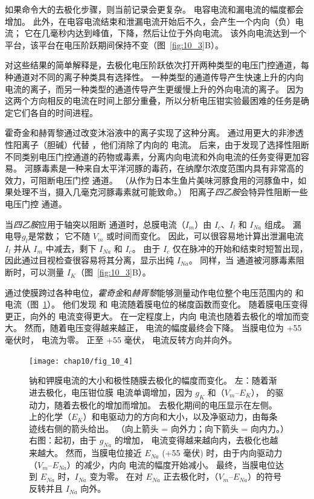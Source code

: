 如果命令大的去极化步骤，则当前记录会更复杂。
电容电流和漏电流的幅度都会增加。
此外，在电容电流结束和泄漏电流开始后不久，会产生一个内向（负）电流；
它在几毫秒内达到峰值，下降，然后让位于外向电流。
该外向电流达到一个平台，该平台在电压阶跃期间保持不变（图~\ref{fig:10_3}B）。


对这些结果的简单解释是，去极化电压阶跃依次打开两种类型的电压门控通道，每种通道对不同的离子种类具有选择性。
一种类型的通道传导产生快速上升的内向电流的离子，而另一种类型的通道传导产生更缓慢上升的外向电流的离子。
因为这两个方向相反的电流在时间上部分重叠，所以分析电压钳实验最困难的任务是确定它们各自的时间进程。


霍奇金和赫胥黎通过改变沐浴液中的离子实现了这种分离。
通过用更大的非渗透性阳离子（胆碱）代替 ，他们消除了内向的  电流。
后来，由于发现了选择性阻断不同类别电压门控通道的药物或毒素，分离内向电流和外向电流的任务变得更加容易。
河豚毒素是一种来自太平洋河豚的毒药，在纳摩尔浓度范围内具有非常高的效力，可阻断电压门控  通道。
（从作为日本生鱼片美味河豚食用的河豚鱼中，如果处理不当，摄入几毫克河豚毒素就可能致命。）
阳离子\textit{四乙胺}会特异性阻断一些电压门控  通道。


当\textit{四乙胺}应用于轴突以阻断  通道时，总膜电流（$I_m$）由 $I_c$、$I_l$ 和 $I_{Na}$ 组成。
漏电导$g_l$是常数；
它不随 $V_m$ 或时间而变化。
因此，可以很容易地计算出泄漏电流 $I_l$ 并从 $I_m$ 中减去，剩下 $I_{Na}$ 和 $I_c$。
由于 $I_c$ 仅在脉冲的开始和结束时短暂出现，因此通过目视检查很容易将其分离，显示出纯 $I_{Na}$。
同样，当  通道被河豚毒素阻断时，可以测量 $I_K$（图~\ref{fig:10_3}B）。


通过使膜跨过各种电位，\textit{霍奇金}和\textit{赫胥黎}能够测量动作电位整个电压范围内的  和  电流（图~\ref{fig:10_4}）。
他们发现  和  电流随着膜电位的梯度函数而变化。
随着膜电压变得更正，向外的  电流变得更大。
在一定程度上，内向  电流也随着去极化的增加而变大。
然而，随着电压变得越来越正， 电流的幅度最终会下降。
当膜电位为 +55 毫伏时， 电流为零。
正至 +55 毫伏， 电流反转方向并向外。


\begin{figure}[htbp]
	\centering
	\texttt{[image: chap10/fig\_10\_4]}
	\caption{钠和钾膜电流的大小和极性随膜去极化的幅度而变化。
		左：随着渐进去极化，电压钳位膜  电流单调增加，因为 $g_K$ 和（$V_m – E_K$）， 的驱动力，随着去极化的增加而增加。
		去极化期间的电压显示在左侧。
		 上的化学（$E_K$）和电驱动力的方向和大小，以及净驱动力，由每条迹线右侧的箭头给出。
		（向上箭头 = 向外力；向下箭头 = 向内力。）右图：起初，由于 $g_{Na}$ 的增加， 电流变得越来越向内，去极化也越来越大。
		然而，当膜电位接近 $E_{Na}$ (+55 毫伏) 时，由于内向驱动力（$V_m – E_{Na}$）的减少，内向  电流的幅度开始减小。
		最终，当膜电位达到 $E_{Na}$ 时，$I_{Na}$ 变为零。
		在对 $E_{Na}$ 正去极化时，（$V_m – E_{Na}$）的符号反转并且 $I_{Na}$ 向外。}
	\label{fig:10_4}
\end{figure}


